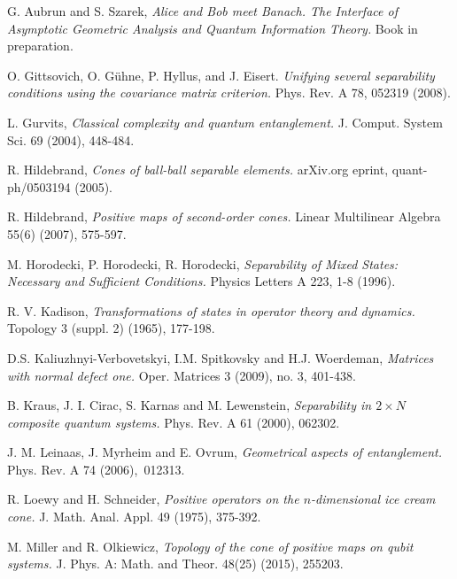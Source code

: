 \documentclass[10pt]{article}
\theoremstyle{plain}
\theoremstyle{definition}
\theoremstyle{remark}
\begin{document}
\begin{thebibliography}{10} 
\footnotesize 
 

G. Aubrun and S. Szarek, 
 {\em Alice and Bob meet Banach. The Interface of Asymptotic Geometric
  Analysis and Quantum Information Theory.}  Book in preparation. 
  
  O. Gittsovich, O. G\"uhne, P. Hyllus, and J. Eisert. 
  {\em Unifying several separability conditions using the covariance matrix criterion.} 
  Phys. Rev. A 78, 052319 (2008).
  
L. Gurvits,
{\em Classical complexity and quantum entanglement.}  
J. Comput. System Sci. 69 (2004), 448-484. 
  
R. Hildebrand, 
{\em Cones of ball-ball separable elements.}  
arXiv.org eprint,  quant-ph/0503194 (2005).

R. Hildebrand, 
{\em Positive maps of second-order cones.}
Linear Multilinear Algebra 55(6) (2007), 575-597. 

M. Horodecki, P. Horodecki, R. Horodecki,
{\em Separability of Mixed States: Necessary and Sufficient Conditions.}
Physics Letters A 223, 1-8 (1996).

R. V. Kadison, 
{\em Transformations of states in operator theory and dynamics.}
Topology  3 (suppl. 2) (1965), 177-198. 

D.S. Kaliuzhnyi-Verbovetskyi, I.M. Spitkovsky and H.J. Woerdeman,
{\em Matrices with normal defect one.}
Oper. Matrices 3 (2009), no. 3, 401-438. 

B. Kraus, J. I. Cirac, S. Karnas and M. Lewenstein,
{\em Separability in $2 \times N$ composite quantum systems.}
Phys. Rev. A 61 (2000), 062302.

J. M. Leinaas, J. Myrheim and E. Ovrum,
{\em Geometrical aspects of entanglement.}
Phys. Rev. A 74 (2006),~012313.

R. Loewy and H. Schneider, 
 {\em Positive operators on the $n$-dimensional ice cream cone.}
{ J. Math. Anal. Appl.} 49 (1975), 375-392. 

M. Miller and R. Olkiewicz, 
 {\em  Topology of the cone of positive maps on qubit systems.} 
J. Phys. A: Math. and Theor. 48(25) (2015), 255203.  


\end{thebibliography}
\end{document}
